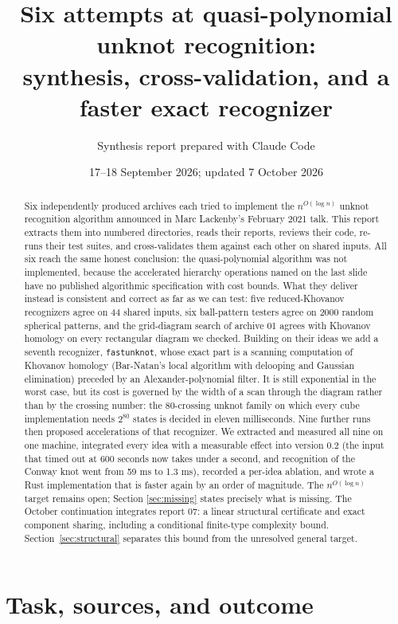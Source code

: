 \documentclass[11pt]{article}
\title{Six attempts at quasi-polynomial unknot recognition:\\
synthesis, cross-validation, and a faster exact recognizer}
\author{Synthesis report prepared with Claude Code}
\date{17--18 September 2026; updated 7 October 2026}
\theoremstyle{remark}
\newcommand{\code}[1]{\texttt{#1}}
\newcommand{\qp}{n^{O(\log n)}}
\begin{document}
\maketitle

\begin{abstract}
Six independently produced archives each tried to implement the $\qp$ unknot
recognition algorithm announced in Marc Lackenby's February 2021 talk. This
report extracts them into numbered directories, reads their reports, reviews
their code, re-runs their test suites, and cross-validates them against each
other on shared inputs. All six reach the same honest conclusion: the
quasi-polynomial algorithm was not implemented, because the accelerated
hierarchy operations named on the last slide have no published algorithmic
specification with cost bounds. What they deliver instead is consistent and
correct as far as we can test: five reduced-Khovanov recognizers agree on 44
shared inputs, six ball-pattern testers agree on 2000 random spherical
patterns, and the grid-diagram search of archive 01 agrees with Khovanov
homology on every rectangular diagram we checked. Building on their ideas we
add a seventh recognizer, \code{fastunknot}, whose exact part is a scanning
computation of Khovanov homology (Bar-Natan's local algorithm with delooping
and Gaussian elimination) preceded by an Alexander-polynomial filter. It is
still exponential in the worst case, but its cost is governed by the width of
a scan through the diagram rather than by the crossing number: the
80-crossing unknot family on which every cube implementation needs $2^{80}$
states is decided in eleven milliseconds. Nine further runs then proposed
accelerations of that recognizer. We extracted and measured all nine on one
machine, integrated every idea with a measurable effect into version 0.2 (the
input that timed out at 600 seconds now takes under a second, and recognition
of the Conway knot went from 59 ms to 1.3 ms), recorded a per-idea ablation,
and wrote a Rust implementation that is faster again by an order of
magnitude. The $\qp$ target remains open; Section \ref{sec:missing} states
precisely what is missing. The October continuation integrates report 07: a
linear structural certificate and exact component sharing, including a
conditional finite-type complexity bound. Section~\ref{sec:structural}
separates this bound from the unresolved general target.
\end{abstract}

\tableofcontents

\section{Task, sources, and outcome}
\end{document}
